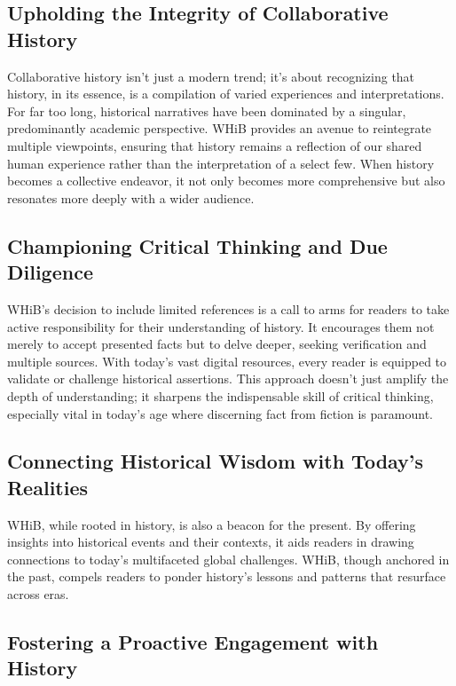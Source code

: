 \documentclass[a4paper,12pt]{book}
\begin{document}
\subsection*{Upholding the Integrity of Collaborative History}

Collaborative history isn't just a modern trend; it's about recognizing that history, in its essence, is a compilation of varied experiences and interpretations. For far too long, historical narratives have been dominated by a singular, predominantly academic perspective. WHiB provides an avenue to reintegrate multiple viewpoints, ensuring that history remains a reflection of our shared human experience rather than the interpretation of a select few. When history becomes a collective endeavor, it not only becomes more comprehensive but also resonates more deeply with a wider audience.

\subsection*{Championing Critical Thinking and Due Diligence}

WHiB's decision to include limited references is a call to arms for readers to take active responsibility for their understanding of history. It encourages them not merely to accept presented facts but to delve deeper, seeking verification and multiple sources. With today's vast digital resources, every reader is equipped to validate or challenge historical assertions. This approach doesn't just amplify the depth of understanding; it sharpens the indispensable skill of critical thinking, especially vital in today's age where discerning fact from fiction is paramount.

\subsection*{Connecting Historical Wisdom with Today's Realities}

WHiB, while rooted in history, is also a beacon for the present. By offering insights into historical events and their contexts, it aids readers in drawing connections to today's multifaceted global challenges. WHiB, though anchored in the past, compels readers to ponder history's lessons and patterns that resurface across eras.

\subsection*{Fostering a Proactive Engagement with History}
\end{document}

